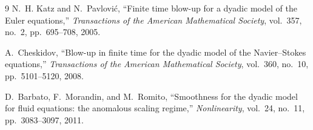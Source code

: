 \documentclass[11pt,a4paper]{article}
\theoremstyle{definition}
\theoremstyle{remark}
\begin{document}
\begin{thebibliography}{9}
N.~H. Katz and N.~Pavlovi\'c, ``Finite time blow-up for a dyadic model of the Euler equations,'' \emph{Transactions of the American Mathematical Society}, vol.~357, no.~2, pp.~695--708, 2005.

A.~Cheskidov, ``Blow-up in finite time for the dyadic model of the Navier--Stokes equations,'' \emph{Transactions of the American Mathematical Society}, vol.~360, no.~10, pp.~5101--5120, 2008.

D.~Barbato, F.~Morandin, and M.~Romito, ``Smoothness for the dyadic model for fluid equations: the anomalous scaling regime,'' \emph{Nonlinearity}, vol.~24, no.~11, pp.~3083--3097, 2011.
\end{thebibliography}
\end{document}
